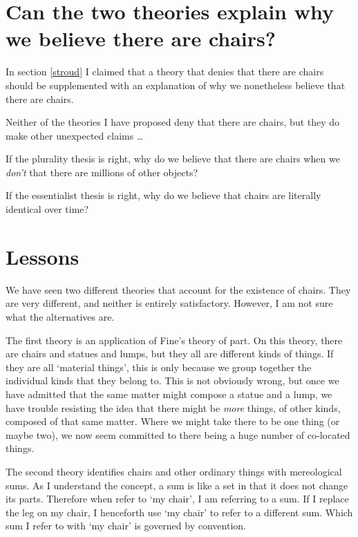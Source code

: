 \documentclass[11pt]{article}
\begin{document}
\begin{spacing}{1.5}

\section{Can the two theories explain why we believe there are
  chairs?}
\label{explain2}
In section \ref{stroud} I claimed that a theory that denies that there
are chairs should be supplemented with an explanation of why we
nonetheless believe that there are chairs.

Neither of the theories I have proposed deny that there are chairs,
but they do make other unexpected claims \ldots

If the plurality thesis is right, why do we believe that there are
chairs when we {\em don't} that there are millions of other objects?

If the essentialist thesis is right, why do we believe that chairs are
literally identical over time?

\section{Lessons}
\label{lessons-p}
We have seen two different theories that account for the existence of
chairs.  They are very different, and neither is entirely
satisfactory.  However, I am not sure what the alternatives are.

The first theory is an application of Fine's theory of part.  On this
theory, there are chairs and statues and lumps, but they all are
different kinds of things.  If they are all `material things', this is
only because we group together the individual kinds that they belong
to.  This is not obviously wrong, but once we have admitted that the
same matter might compose a statue and a lump, we have trouble
resisting the idea that there might be {\em more} things, of other
kinds, composed of that same matter.  Where we might take there to be
one thing (or maybe two), we now seem committed to there being a huge
number of co-located things.

The second theory identifies chairs and other ordinary things with
mereological sums.  As I understand the concept, a sum is like a set
in that it does not change its parts.  Therefore when refer to `my
chair', I am referring to a sum.  If I replace the leg on my chair, I
henceforth use `my chair' to refer to a different sum.  Which sum I
refer to with `my chair' is governed by convention.


\end{spacing}
\end{document}
